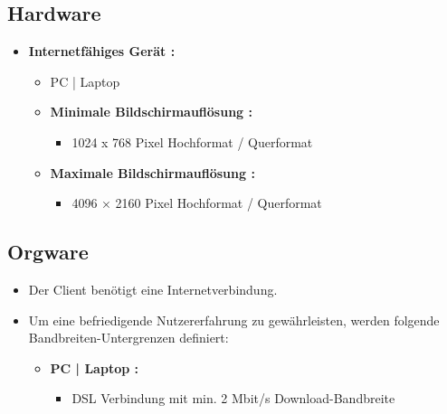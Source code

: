 	\subsection{Hardware}
	\begin{itemize}
		\item \textbf{Internetfähiges Gerät :}
		\begin{itemize}
			\item PC | Laptop
			\item \textbf{Minimale Bildschirmauflösung :}
				\begin{itemize}
					\item 1024 x 768 Pixel Hochformat / Querformat
				\end{itemize}
					\item \textbf{Maximale Bildschirmauflösung :}
				\begin{itemize}
				\item 4096 × 2160 Pixel Hochformat / Querformat
				\end{itemize}		
		\end{itemize}
	\end{itemize}
	\subsection{Orgware}
	\begin{itemize}
		\item Der Client benötigt eine Internetverbindung.
		\item Um eine befriedigende Nutzererfahrung zu gewährleisten, werden folgende Bandbreiten-Untergrenzen definiert:
		\begin{itemize}
			\item \textbf{ PC | Laptop :}
			\begin{itemize}
				\item DSL Verbindung mit min. 2 Mbit/s Download-Bandbreite
			\end{itemize}
		\end{itemize}
	\end{itemize}
	
